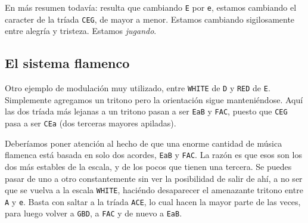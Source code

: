 \documentclass[]{article}
\begin{document}
En más resumen todavía: resulta que cambiando \texttt{E} por \texttt{e}, estamos cambiando el caracter de la tríada \texttt{CEG}, de mayor a menor. Estamos cambiando sigilosamente entre alegría y tristeza. Estamos \emph{jugando}.

\subsection{El sistema flamenco}
Otro ejemplo de modulación muy utilizado, entre \texttt{WHITE} de \texttt{D} y \texttt{RED} de \texttt{E}. Simplemente agregamos un tritono pero la orientación sigue manteniéndose. Aquí las dos tríada más lejanas a un tritono pasan a ser \texttt{EaB} y \texttt{FAC}, puesto que \texttt{CEG} pasa a ser \texttt{CEa} (dos terceras mayores apiladas).

Deberíamos poner atención al hecho de que una enorme cantidad de música flamenca está basada en solo dos acordes, \texttt{EaB} y \texttt{FAC}. La razón es que esos son los dos más estables de la escala, y de los pocos que tienen una tercera. Se puedes pasar de uno a otro constantemente sin ver la posibilidad de salir de ahí, a no ser que se vuelva a la escala \texttt{WHITE}, haciéndo desaparecer el amenazante tritono entre \texttt{A} y \texttt{e}. Basta con saltar a la tríada \texttt{ACE}, lo cual hacen la mayor parte de las veces, para luego volver a \texttt{GBD}, a \texttt{FAC} y de nuevo a \texttt{EaB}.
\end{document}
